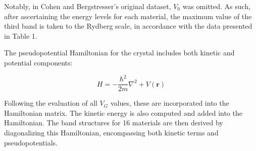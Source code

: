 \documentclass[twocolumn]{article}[h]
\begin{document}
Notably, in Cohen and Bergstresser's original dataset, \( V_0 \) was omitted. As such, after ascertaining the energy levels for each material, the maximum value of the third band is taken to the Rydberg scale, in accordance with the data presented in Table 1.

The pseudopotential Hamiltonian for the crystal includes both kinetic and potential components:

\begin{equation}
    H = -\frac{\hbar^2}{2m}\nabla^2 + V(\mathbf{r})
\end{equation}

Following the evaluation of all \( V_G \) values, these are incorporated into the Hamiltonian matrix. The kinetic energy is also computed and added into the Hamiltonian. The band structures for 16 materials are then derived by diagonalizing this Hamiltonian, encompassing both kinetic terms and pseudopotentials.
\end{document}
